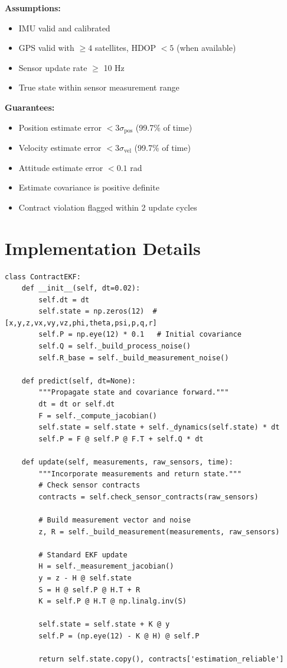 \begin{contractbox}
\textbf{Assumptions:}
\begin{itemize}
    \item IMU valid and calibrated
    \item GPS valid with $\geq 4$ satellites, HDOP $< 5$ (when available)
    \item Sensor update rate $\geq$ 10 Hz
    \item True state within sensor measurement range
\end{itemize}

\textbf{Guarantees:}
\begin{itemize}
    \item Position estimate error $< 3\sigma_{\text{pos}}$ (99.7\% of time)
    \item Velocity estimate error $< 3\sigma_{\text{vel}}$ (99.7\% of time)
    \item Attitude estimate error $< 0.1$ rad
    \item Estimate covariance is positive definite
    \item Contract violation flagged within 2 update cycles
\end{itemize}
\end{contractbox}

\section{Implementation Details}

\begin{lstlisting}[caption={ContractEKF class structure}]
class ContractEKF:
    def __init__(self, dt=0.02):
        self.dt = dt
        self.state = np.zeros(12)  # [x,y,z,vx,vy,vz,phi,theta,psi,p,q,r]
        self.P = np.eye(12) * 0.1   # Initial covariance
        self.Q = self._build_process_noise()
        self.R_base = self._build_measurement_noise()

    def predict(self, dt=None):
        """Propagate state and covariance forward."""
        dt = dt or self.dt
        F = self._compute_jacobian()
        self.state = self.state + self._dynamics(self.state) * dt
        self.P = F @ self.P @ F.T + self.Q * dt

    def update(self, measurements, raw_sensors, time):
        """Incorporate measurements and return state."""
        # Check sensor contracts
        contracts = self.check_sensor_contracts(raw_sensors)

        # Build measurement vector and noise
        z, R = self._build_measurement(measurements, raw_sensors)

        # Standard EKF update
        H = self._measurement_jacobian()
        y = z - H @ self.state
        S = H @ self.P @ H.T + R
        K = self.P @ H.T @ np.linalg.inv(S)

        self.state = self.state + K @ y
        self.P = (np.eye(12) - K @ H) @ self.P

        return self.state.copy(), contracts['estimation_reliable']
\end{lstlisting}

